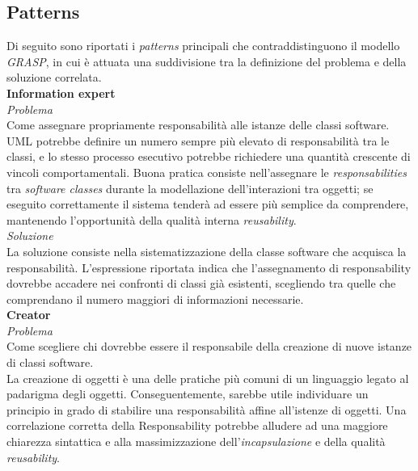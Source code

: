 \documentclass{article}
\begin{document}
\subsection*{Patterns}
\large
Di seguito sono riportati i \textit{patterns} principali che contraddistinguono il modello \textit{GRASP}, in cui è attuata una suddivisione tra la definizione del problema e della soluzione correlata.\vspace*{14pt}\\
\textbf{Information expert}\vspace*{7pt}\\
\textit{Problema}\\
Come assegnare propriamente responsabilità alle istanze delle classi software.\vspace*{7pt}\\
UML potrebbe definire un numero sempre più elevato di responsabilità tra le classi, e lo stesso processo esecutivo potrebbe richiedere una quantità crescente di vincoli comportamentali. Buona pratica consiste nell'assegnare le \textit{responsabilities} tra \textit{software classes} durante la modellazione dell'interazioni tra oggetti; se eseguito correttamente il sistema tenderà ad essere più semplice da comprendere, mantenendo l'opportunità della qualità interna \textit{reusability}.\vspace*{14pt}\\ 
\textit{Soluzione}\\
La soluzione consiste nella sistematizzazione della classe software che acquisca la responsabilità. L'espressione riportata indica che l'assegnamento di responsability dovrebbe accadere nei confronti di classi già esistenti, scegliendo tra quelle che comprendano il numero maggiori di informazioni necessarie.\vspace*{14pt}\\
\textbf{Creator}\vspace*{7pt}\\
\textit{Problema}\\
Come scegliere chi dovrebbe essere il responsabile della creazione di nuove istanze di classi software.\vspace*{7pt}\\
La creazione di oggetti è una delle pratiche più comuni di un linguaggio legato al padarigma degli oggetti. Conseguentemente, sarebbe utile individuare un principio in grado di stabilire una responsabilità affine all'istenze di oggetti. Una correlazione corretta della Responsability potrebbe alludere ad una maggiore chiarezza sintattica e alla massimizzazione dell'\textit{incapsulazione} e della qualità \textit{reusability}.\vspace*{14pt}\\
\end{document}
